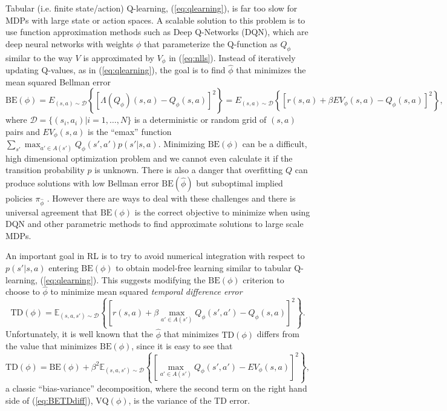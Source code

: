 Tabular (i.e. finite state/action) Q-learning, (\ref{eq:qlearning}), is far too slow for MDPs with large state or action spaces. 
A scalable solution to this problem is to use function approximation methods 
such as Deep Q-Networks (DQN), which are  deep neural networks with weights $\phi$ 
that parameterize the Q-function as $Q_\phi$ similar to the way $V$ is approximated by $V_\phi$ in (\ref{eq:nlls}).
Instead of iteratively updating Q-values, as in (\ref{eq:qlearning}), 
the goal is to find $\hat\phi$ that minimizes the mean squared Bellman error
\begin{equation} 
   \mbox{BE}(\phi) = E_{(s,a) \sim \mathcal{D}} \left\{\left[\Lambda(Q_\phi)(s,a)-Q_\phi(s,a)\right]^2\right\}
=E_{(s,a) \sim \mathcal{D}}\left\{\left[ r(s,a)+\beta EV_\phi(s,a) -Q_\phi(s,a)\right]^2\right\},
\label{eq:dqnideal}
\end{equation}
where $\mathcal{D}=\{(s_i,a_i)|i=1,\ldots,N\}$ is a deterministic or random grid of $(s,a)$ pairs and $EV_\phi(s,a)$ is the
``emax'' function $\sum_{s'} \max_{a' \in A(s')} Q_\phi(s',a')p(s'|s,a)$.
Minimizing $\mbox{BE}(\phi)$ can be a difficult, high dimensional
optimization problem and we cannot even calculate it if the transition probability
$p$ is unknown.  There is also a danger that overfitting $Q$ can produce solutions with
low Bellman error $\mbox{BE}(\hat\phi)$ but suboptimal implied policies $\pi_{\hat\phi}$ \citep{fu2019diagnosing}.
However there are ways to deal with these challenges and  there is universal agreement that $\mbox{BE}(\phi)$ is the correct
objective to minimize when using DQN and other parametric methods to find approximate solutions to large scale MDPs.

An important goal in RL  is to try to avoid numerical integration with respect to  $p(s'|s,a)$ 
entering $\mbox{BE}(\phi)$ to obtain model-free learning similar to tabular Q-learning, (\ref{eq:qlearning}). This
suggests modifying the $\mbox{BE}(\phi)$ criterion to choose to $\hat\phi$ to minimize mean squared {\it temporal difference error\/}
\begin{equation}
      \mbox{TD}(\phi) = \mathbb{E}_{(s,a,s')\sim\mathcal{D}} \left\{ \left[r(s,a) + \beta \max_{a' \in A(s')} Q_{\phi}(s', a') - Q_\phi(s, a) \right]^2 \right\}.
\label{eq:td_loss}
\end{equation}
Unfortunately, it is well known that the $\hat\phi$ that minimizes $\mbox{TD}(\phi)$ 
differs from the value that minimizes $\mbox{BE}(\phi)$, since it is easy to see that
\begin{equation}
         \mbox{TD}(\phi) = \mbox{BE}(\phi) + \beta^2 \mathbb{E}_{(s,a,s')\sim\mathcal{D}} \left\{ \left[ \max_{a' \in A(s')} Q_\phi(s',a')
- EV_{\phi}(s,a)\right]^2\right\},
\label{eq:BETDdiff}
\end{equation}
a classic ``bias-variance'' decomposition,  where the second term on the right hand side of (\ref{eq:BETDdiff}), $\mbox{VQ}(\phi)$, is the
variance of the TD error.  

